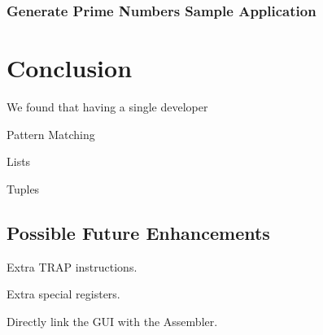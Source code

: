 \documentclass[a4paper,11pt]{report}
\begin{document}
\subsection{Generate Prime Numbers Sample Application}
\label{primenumbers}
\chapter*{Conclusion}
We found that having a single developer 

Pattern Matching

Lists

Tuples

\section*{Possible Future Enhancements}
Extra TRAP instructions.

Extra special registers.

Directly link the GUI with the Assembler.
\end{document}
